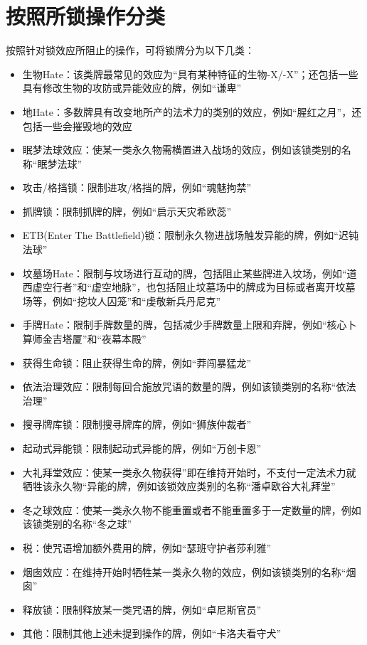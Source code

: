 \documentclass[lang = cn, color = black, 10pt]{AllThatStax}
\begin{document}
\section*{按照所锁操作分类}

按照针对锁效应所阻止的操作，可将锁牌分为以下几类：

\begin{itemize}
    \item 生物Hate：该类牌最常见的效应为“具有某种特征的生物-X/-X”；还包括一些具有修改生物的攻防或异能效应的牌，例如“谦卑”
	\item 地Hate：多数牌具有改变地所产的法术力的类别的效应，例如“腥红之月”，还包括一些会摧毁地的效应
	\item 眠梦法球效应：使某一类永久物需横置进入战场的效应，例如该锁类别的名称“眠梦法球”
	\item 攻击/格挡锁：限制进攻/格挡的牌，例如“魂魅拘禁”
	\item 抓牌锁：限制抓牌的牌，例如“启示天灾希欧蕊”
	\item ETB(Enter The Battlefield)锁：限制永久物进战场触发异能的牌，例如“迟钝法球”
	\item 坟墓场Hate：限制与坟场进行互动的牌，包括阻止某些牌进入坟场，例如“道西虚空行者”和“虚空地脉”，也包括阻止坟墓场中的牌成为目标或者离开坟墓场等，例如“挖坟人囚笼”和“虔敬新兵丹尼克”
	\item 手牌Hate：限制手牌数量的牌，包括减少手牌数量上限和弃牌，例如“核心卜算师金吉塔厦”和“夜幕本殿”
	\item 获得生命锁：阻止获得生命的牌，例如“莽闯暴猛龙”
	\item 依法治理效应：限制每回合施放咒语的数量的牌，例如该锁类别的名称“依法治理”
	\item 搜寻牌库锁：限制搜寻牌库的牌，例如“狮族仲裁者”
	\item 起动式异能锁：限制起动式异能的牌，例如“万创卡恩”
	\item 大礼拜堂效应：使某一类永久物获得”即在维持开始时，不支付一定法术力就牺牲该永久物“异能的牌，例如该锁效应类别的名称“潘卓欧谷大礼拜堂”
	\item 冬之球效应：使某一类永久物不能重置或者不能重置多于一定数量的牌，例如该锁类别的名称“冬之球”
	\item 税：使咒语增加额外费用的牌，例如“瑟班守护者莎利雅”
	\item 烟囱效应：在维持开始时牺牲某一类永久物的效应，例如该锁类别的名称“烟囱”
	\item 释放锁：限制释放某一类咒语的牌，例如“卓尼斯官员”
	\item 其他：限制其他上述未提到操作的牌，例如“卡洛夫看守犬”
\end{itemize}
\end{document}
